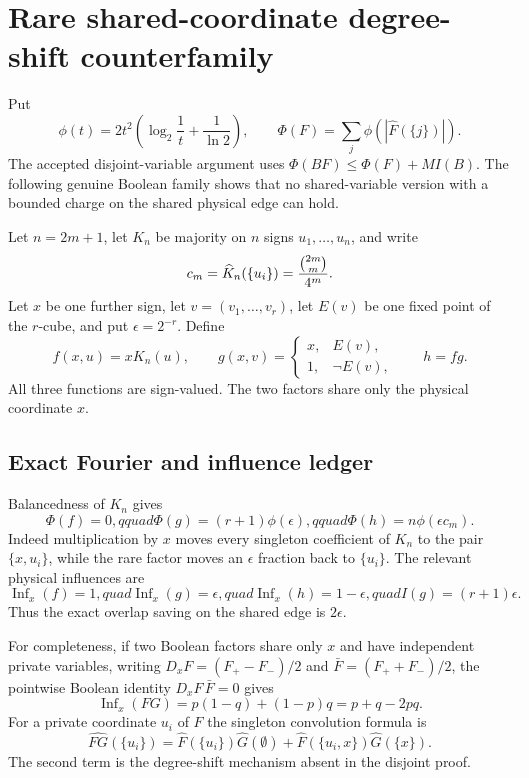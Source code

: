 \section*{Rare shared-coordinate degree-shift counterfamily}

Put
\[
 \phi(t)=2t^2\left(\log_2\frac1t+\frac1{\ln2}\right),\qquad
 \Phi(F)=\sum_j\phi(|\widehat F(\{j\})|).
\]
The accepted disjoint-variable argument uses
$\Phi(BF)\leq \Phi(F)+M I(B)$.  The following genuine Boolean family
shows that no shared-variable version with a bounded charge on the shared
physical edge can hold.

Let $n=2m+1$, let $K_n$ be majority on $n$ signs $u_1,\ldots,u_n$, and
write
\[
 c_m=\widehat K_n(\{u_i\})={\binom{2m}{m}\over 4^m}.
\]
Let $x$ be one further sign, let $v=(v_1,\ldots,v_r)$, let $E(v)$ be one
fixed point of the $r$-cube, and put $\epsilon=2^{-r}$.  Define
\[
 f(x,u)=xK_n(u),\qquad
 g(x,v)=\begin{cases}x,&E(v),\\1,&\neg E(v),\end{cases}\qquad h=fg.
\]
All three functions are sign-valued.  The two factors share only the
physical coordinate $x$.

\subsection*{Exact Fourier and influence ledger}
Balancedness of $K_n$ gives
\[
 \Phi(f)=0,qquad \Phi(g)=(r+1)\phi(\epsilon),qquad
 \Phi(h)=n\phi(\epsilon c_m).
\]
Indeed multiplication by $x$ moves every singleton coefficient of $K_n$
to the pair $\{x,u_i\}$, while the rare factor moves an $\epsilon$ fraction
back to $\{u_i\}$.  The relevant physical influences are
\[
 \operatorname{Inf}_x(f)=1,quad \operatorname{Inf}_x(g)=\epsilon,quad
 \operatorname{Inf}_x(h)=1-\epsilon,quad I(g)=(r+1)\epsilon.
\]
Thus the exact overlap saving on the shared edge is $2\epsilon$.

For completeness, if two Boolean factors share only $x$ and have independent
private variables, writing $D_xF=(F_+-F_-)/2$ and
$\bar F=(F_++F_-)/2$, the pointwise Boolean identity
$D_xF\,\bar F=0$ gives
\[
 \operatorname{Inf}_x(FG)=p(1-q)+(1-p)q=p+q-2pq.
\]
For a private coordinate $u_i$ of $F$ the singleton convolution formula is
\[
 \widehat{FG}(\{u_i\})
 =\widehat F(\{u_i\})\widehat G(\emptyset)
  +\widehat F(\{u_i,x\})\widehat G(\{x\}).
\]
The second term is the degree-shift mechanism absent in the disjoint proof.

